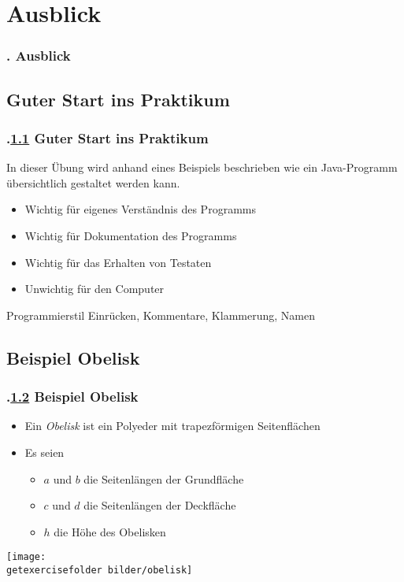 \section{Ausblick}
\begin{frame}
\frametitle{\kap. Ausblick}%
\tableofcontents[current]
\end{frame}
\def\stitle{Guter Start ins Praktikum}%
\subsection{\stitle}\label{S:Guter Start}
\begin{frame}[t]%
  \frametitle{\kap.\ref{S:Guter Start} \stitle}%

In dieser \"Ubung wird anhand eines Beispiels beschrieben wie ein Java-Programm \"ubersichtlich gestaltet werden kann.

\begin{itemize}
    \item Wichtig f\"ur eigenes Verst\"andnis des Programms
    \item Wichtig f\"ur Dokumentation des Programms
    \item Wichtig f\"ur das Erhalten von Testaten
    \item Unwichtig f\"ur den Computer
\end{itemize}

\bigskip
\begin{block}{Programmierstil}
Einr\"ucken, Kommentare, Klammerung, Namen
\end{block}

\end{frame}

\def\stitle{Beispiel Obelisk}%
\subsection{\stitle}\label{S:Beispiel Obelisk}
\begin{frame}[t]%
    \frametitle{\kap.\ref{S:Beispiel Obelisk} \stitle}%

\begin{itemize}
 \item Ein \emph{Obelisk} ist ein Polyeder mit trapezf\"ormigen Seitenfl\"achen
 \item Es seien
 \begin{itemize}
  \item $a$ und $b$ die Seitenl\"angen der Grundfl\"ache
  \item $c$ und $d$ die Seitenl\"angen der Deckfl\"ache
  \item $h$ die H\"ohe des Obelisken
 \end{itemize}
\end{itemize}

\begin{center}
\texttt{[image: \\getexercisefolder bilder/obelisk]}
\end{center}
\end{frame}


